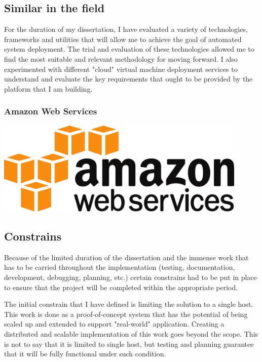 \documentclass{article}
\begin{document}
\subsection{Similar in the field}
For the duration of my dissertation, I have evaluated a variety of technologies, frameworks and utilities that will allow me to achieve the goal of automated system deployment. The trial and evaluation of these technologies allowed me to find the most suitable and relevant methodology for moving forward. I also experimented with different "cloud" virtual machine deployment services to understand and evaluate the key requirements that ought to be provided by the platform that I am building.

\subsubsection{Amazon Web Services}
\begin{center}
    \includegraphics[width=12cm]{2000px-AmazonWebservices_Logo.svg.png}
\end{center}


\subsection{Constrains}
Because of the limited duration of the dissertation and the immense work that has to be carried throughout the implementation (testing, documentation, development, debugging, planning, etc.) certain constrains had to be put in place to ensure that the project will be completed within the appropriate period.

The initial constrain that I have defined is limiting the solution to a single host. This work is done as a proof-of-concept system that has the potential of being scaled up and extended to support "real-world" application.
Creating a distributed and scalable implementation of this work goes beyond the scope. This is not to say that it is limited to single host, but testing and planning guarantee that it will be fully functional under such condition.
\end{document}
